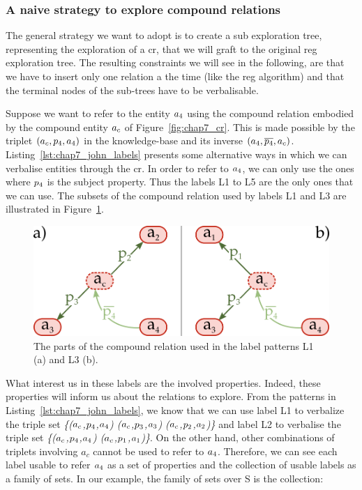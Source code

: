\subsubsection{A naive strategy to explore compound relations}

The general strategy we want to adopt is to create a sub exploration tree, representing the exploration of a \acrshort{cr}, that we will graft to the original \acrshort{reg} exploration tree. The resulting constraints we will see in the following, are that we have to insert only one relation a the time (like the \acrshort{reg} algorithm) and that the terminal nodes of the sub-trees have to be verbalisable.

Suppose we want to refer to the entity $a_4$ using the compound relation embodied by the compound entity $a_c$ of Figure~\ref{fig:chap7_cr}. This is made possible by the triplet $(a_c,p_4,a_4)$ in the knowledge-base and its inverse $(a_4, \overline{p_4}, a_c)$. Listing~\ref{lst:chap7_john_labels} presents some alternative ways in which we can verbalise entities through the \acrshort{cr}. In order to refer to $a_4$, we can only use the ones where $p_4$ is the subject property. Thus the labels L1 to L5 are the only ones that we can use. The subsets of the compound relation used by labels L1 and L3 are illustrated in Figure~\ref{fig:chap7_cr_part}.

\begin{figure}[ht!]
\centering
\includegraphics[scale=0.4]{figures/chapter7/CR_part.png}
\caption{\label{fig:chap7_cr_part} The parts of the compound relation used in the label patterns L1 (a) and L3 (b).}
\end{figure}

What interest us in these labels are the involved properties. Indeed, these properties will inform us about the relations to explore. From the patterns in Listing~\ref{lst:chap7_john_labels}, we know that we can use label L1 to verbalize the triple set \textit{\{($a_c$,$p_4$,$a_4$) ($a_c$,$p_3$,$a_3$) ($a_c$,$p_2$,$a_2$)\}} and label L2 to verbalise the triple set \textit{\{($a_c$,$p_4$,$a_4$) ($a_c$,$p_1$,$a_1$)\}}. On the other hand, other combinations of triplets involving $a_c$ cannot be used to refer to $a_4$. Therefore, we can see each label usable to refer $a_4$ as a set of properties and the collection of usable labels as a family of sets. In our example, the family of sets over S is the collection:

